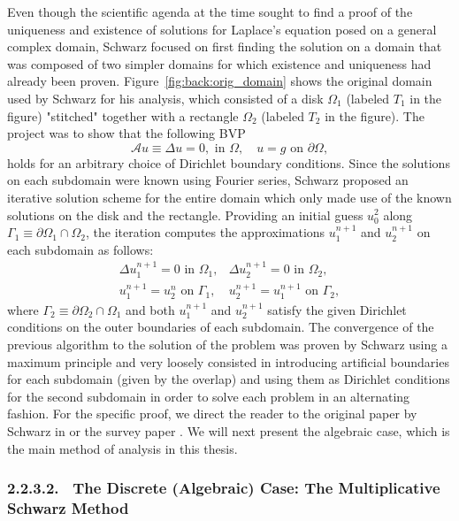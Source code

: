 Even though the scientific agenda at the time sought to find a proof of the uniqueness and existence of solutions for Laplace's equation posed on a general complex domain, Schwarz focused on first finding the solution on a domain that was composed of two simpler domains for which existence and uniqueness had already been proven. Figure~\ref{fig:back:orig_domain} shows the original domain used by Schwarz for his analysis, which consisted of a disk $\Omega_1$ (labeled $T_1$ in the figure) "stitched" together with a rectangle $\Omega_2$ (labeled $T_2$ in the figure). The project was to show that the following BVP
%
\begin{equation}\label{eq:back:Laplace}
\mathscr{A}u\equiv\Delta u=0,\text{ in }\Omega,\quad u=g\text{ on }\partial\Omega,
\end{equation}
%
holds for an arbitrary choice of Dirichlet boundary conditions.
Since the solutions on each subdomain were known using Fourier series,
Schwarz proposed an iterative solution scheme for the entire domain which only made use of the known solutions on the disk and the rectangle.
Providing an initial guess $u_0^2$ along $\Gamma_1\equiv\partial\Omega_1\cap\Omega_2$, the iteration computes the approximations $u_1^{n+1}$ and $u_2^{n+1}$ on each subdomain as follows:
\begin{equation}\label{eq:back:AltSchwarz}
\begin{array}{cc}
\Delta u_1^{n+1} = 0 \text{ in } \Omega_1, & \Delta u_2^{n+1} = 0 \text{ in } \Omega_2,\\
u_1^{n+1} = u_2^{n} \text{ on } \Gamma_1, & u_2^{n+1} = u_1^{n+1} \text{ on } \Gamma_2,
\end{array}
\end{equation}
where $\Gamma_2\equiv\partial\Omega_2\cap\Omega_1$ and both $u_1^{n+1}$ and $u_2^{n+1}$ satisfy the given Dirichlet conditions on the outer boundaries of each subdomain. The convergence of the previous algorithm to the solution of the problem was proven by Schwarz using a maximum principle and very loosely consisted in introducing artificial boundaries for each subdomain (given by the overlap) and using them as Dirichlet conditions for the second subdomain in order to solve each problem in an alternating fashion. For the specific proof, we direct the reader to the original paper by Schwarz in \cite{Sch69} or the survey paper \cite{Gan08}. We will next present the algebraic case, which is the main method of analysis in this thesis.

\subsubsection{2.2.3.2. \ The Discrete (Algebraic) Case: The Multiplicative Schwarz Method}
\label{back:itersolvers:DDM:MultSchwarz}

